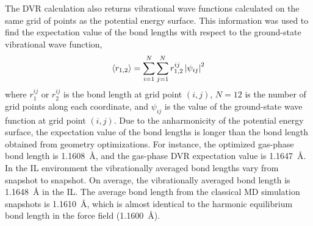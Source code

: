 \documentclass[%
  class = book,%
  crop = false,%
  float = true,%
  multi = true,%
  preview = false,%
]{standalone}
\begin{document}
The DVR calculation also returns vibrational wave functions calculated on the same grid of points as the potential energy surface. This information was used to find the expectation value of the bond lengths with respect to the ground-state vibrational wave function,
\begin{equation}
  \label{paper_02:eq:3}
  \Braket{ r_{1,2} } = \sum_{i = 1}^{N} \sum_{j = 1}^{N} r_{1,2}^{ij}\left| \psi_{ij} \right|^{2}
\end{equation}
where \(r_{1}^{ij}\) or \(r_{2}^{ij}\) is the bond length at grid point \((i,j)\), \(N = 12\) is the number of grid points along each coordinate, and \(\psi_{ij}\) is the value of the ground-state wave function at grid point \((i,j)\). Due to the anharmonicity of the potential energy surface, the expectation value of the bond lengths is longer than the bond length obtained from geometry optimizations. For instance, the optimized gas-phase bond length is \SI{1.1608}{\angstrom}, and the gas-phase DVR expectation value is \SI{1.1647}{\angstrom}. In the IL environment the vibrationally averaged  bond lengths vary from snapshot to snapshot. On average, the vibrationally averaged  bond length is \SI{1.1648}{\angstrom} in the IL. The average bond length from the classical MD simulation snapshots is \SI{1.1610}{\angstrom}, which is almost identical to the harmonic equilibrium bond length in the force field (\SI{1.1600}{\angstrom}).
\end{document}
